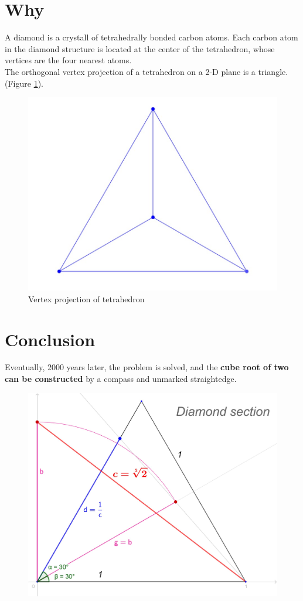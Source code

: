 \documentclass[12pt, letterpaper, oneside]{report}
\begin{document}
\section {Why}
A diamond is a crystall of tetrahedrally bonded carbon atoms.
Each carbon atom in the diamond structure is located at the center of the tetrahedron, whose vertices are the four nearest atoms.\cite{B}
\\
The orthogonal vertex projection of a tetrahedron on a 2-D plane is a triangle. (Figure \ref{fig:tetrahedron}).
\begin{figure}[h]
	\centering
	\includegraphics[width=0.3\linewidth]{images/tetrahedron}
	\caption{Vertex projection of tetrahedron}
	\label{fig:tetrahedron}
\end{figure}


\section{Conclusion}
\begin{center}
	Eventually, 2000 years later, the problem is solved, and the \textbf{cube root of two} \textbf{can be constructed} by a compass and unmarked straightedge.
\end{center}



\begin{figure}[h]
	\centering
	\includegraphics[width=0.6\linewidth]{images/ds_def.jpg}
	
	\label{fig:Diamond Section}
\end{figure}
\end{document}
